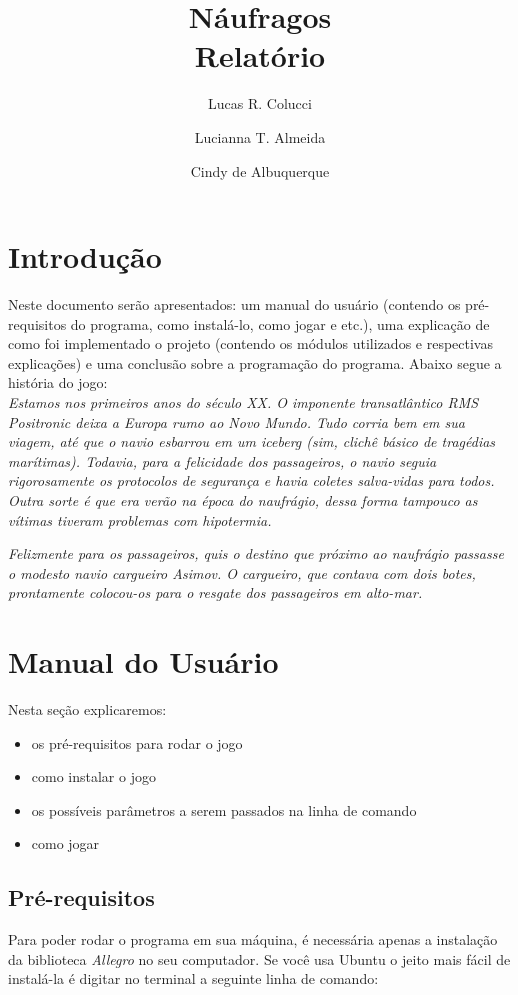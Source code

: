 \documentclass[12pt,a4paper]{article}
\title{Náufragos\\Relatório}
\author{Lucas R. Colucci \and Lucianna T. Almeida \and Cindy de Albuquerque}
\begin{document}
\maketitle

\newpage

\tableofcontents
\newpage

\section{Introdução}
Neste documento serão apresentados: um manual do usuário (contendo os pré-requisitos do programa, como instalá-lo,
 como jogar e etc.), uma explicação de como foi implementado o projeto
 (contendo os módulos utilizados e respectivas explicações) e uma conclusão sobre a programação do programa.
Abaixo segue a história do jogo:\\

\emph{Estamos nos primeiros anos do século XX. O imponente transatlântico RMS Positronic deixa a Europa rumo ao Novo Mundo. Tudo corria bem em sua viagem, até que o navio esbarrou em um iceberg (sim, clichê básico de tragédias marítimas). Todavia, para a felicidade dos passageiros, o navio seguia rigorosamente os protocolos de segurança e havia coletes salva-vidas para todos. Outra sorte é que era verão na época do naufrágio, dessa forma tampouco as vítimas tiveram problemas com hipotermia.}

\emph{Felizmente para os passageiros, quis o destino que próximo ao naufrágio passasse o modesto navio cargueiro Asimov. O cargueiro, que contava com dois botes, prontamente colocou-os para o resgate dos passageiros em alto-mar. }
 
\section{Manual do Usuário}

Nesta seção explicaremos:
\begin{itemize}
\item os pré-requisitos para rodar o jogo
\item como instalar o jogo
\item os possíveis parâmetros a serem passados na linha de comando
\item como jogar
\end{itemize}
 

\subsection{Pré-requisitos}
Para poder rodar o programa em sua máquina, é necessária apenas a instalação da biblioteca \emph{Allegro} no seu computador.
Se você usa Ubuntu o jeito mais fácil de instalá-la é digitar no terminal a seguinte linha de comando:
\end{document}
